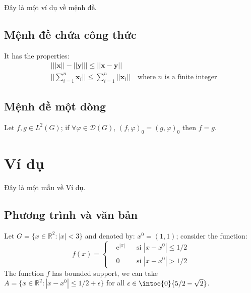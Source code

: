 \documentclass[12pt,fleqn]{book} %
\begin{document}
Đây là một ví dụ về mệnh đề.

\subsection{Mệnh đề chứa công thức}

\begin{proposition}
It has the properties:
\begin{align}
& \big| ||\mathbf{x}|| - ||\mathbf{y}|| \big|\leq || \mathbf{x}- \mathbf{y}||\\
&  ||\sum_{i=1}^n\mathbf{x}_i||\leq \sum_{i=1}^n||\mathbf{x}_i||\quad\text{where $n$ is a finite integer}
\end{align}
\end{proposition}

\subsection{Mệnh đề một dòng}

\begin{proposition} 
Let $f,g\in L^2(G)$; if $\forall \varphi\in\mathcal{D}(G)$, $(f,\varphi)_0=(g,\varphi)_0$ then $f = g$. 
\end{proposition}


\section{Ví dụ}

Đây là một mẫu về Ví dụ.

\subsection{Phương trình và văn bản}

\begin{example}
Let $G=\{x\in\mathbb{R}^2:|x|<3\}$ and denoted by: $x^0=(1,1)$; consider the function:
\begin{equation}
f(x)=\left\{\begin{aligned} & \mathrm{e}^{|x|} & & \text{si $|x-x^0|\leq 1/2$}\\
& 0 & & \text{si $|x-x^0|> 1/2$}\end{aligned}\right.
\end{equation}
The function $f$ has bounded support, we can take $A=\{x\in\mathbb{R}^2:|x-x^0|\leq 1/2+\epsilon\}$ for all $\epsilon\in\intoo{0}{5/2-\sqrt{2}}$.
\end{example}
\end{document}
